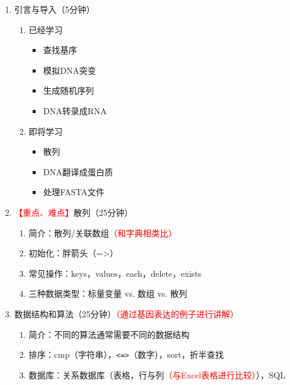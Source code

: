 \documentclass{TIJMUjiaoanLL}
\begin{document}
\begin{enumerate}
  \item 引言与导入（5分钟）
    \begin{enumerate}
      \item 已经学习
	\vspace{-1em}
	\begin{multicols}{2}
	\begin{itemize}
	  \item 查找基序
	  \item 模拟DNA突变
	  \item 生成随机序列
	  \item DNA转录成RNA
	\end{itemize}
	\end{multicols}
	\vspace{-1em}
      \item 即将学习
	\vspace{-1em}
	\begin{multicols}{3}
	\begin{itemize}
	  \item 散列
	  \item DNA翻译成蛋白质
	  \item 处理FASTA文件
	\end{itemize}
	\end{multicols}
	\vspace{-1em}
    \end{enumerate}
  \item \textcolor{red}{【重点、难点】}散列（25分钟）
    \begin{enumerate}
      \item 简介：散列/关联数组\textcolor{red}{（和字典相类比）}
      \item 初始化：胖箭头（=>）
      \item 常见操作：keys，values，each，delete，exists
      \item 三种数据类型：标量变量 vs. 数组 vs. 散列
    \end{enumerate}
  \item 数据结构和算法（25分钟）\textcolor{red}{（通过基因表达的例子进行讲解）}
    \begin{enumerate}
      \item 简介：不同的算法通常需要不同的数据结构
      \item 排序：cmp（字符串），\verb|<=>|（数字），sort，折半查找
      \item 数据库：关系数据库（表格，行与列\textcolor{red}{（与Excel表格进行比较）}），SQL

\end{enumerate}
\end{enumerate}
\end{document}
